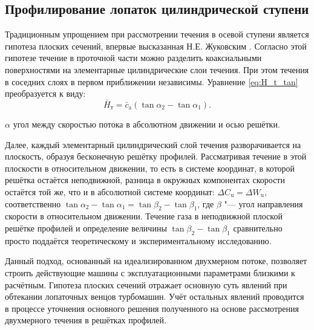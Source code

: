 \subsection{Профилирование лопаток цилиндрической ступени}\label{sec:ch1/profil}

 Традиционным упрощением при рассмотрении течения в осевой ступени является гипотеза плоских сечений, впервые высказанная Н.Е. Жуковским \cite{Joukovskiy1949}. Согласно этой гипотезе течение в проточной части можно разделить коаксиальными поверхностями на элементарные цилиндрические слои течения. При этом течения в соседних слоях в первом приближении независимы. Уравнение \ref{eq:H_t_tan} преобразуется к виду:
\begin{equation}
	\bar{H}_\text{т} = \bar{c}_\text{a} \left( \tan\alpha_2 - \tan\alpha_1 \right).
	\label{eq:H_t_cil}
\end{equation}
\begin{eqexpl}
	\item{$\alpha$} угол между скоростью потока в абсолютном движении и осью решётки.
\end{eqexpl}

Далее, каждый элементарный цилиндрический слой течения разворачивается на плоскость, образуя бесконечную решётку профилей. Рассматривая течение в этой плоскости в относительном движении, то есть в системе координат, в которой решётка остаётся неподвижной, разница в окружных компонентах скорости остаётся той же, что и в абсолютной системе координат: \(\Delta C_\text{u} = \Delta W_\text{u}\), соответственно \(\tan\alpha_2 - \tan\alpha_1 = \tan\beta_2 - \tan\beta_1\), где \(\beta\) "--- угол направления скорости в относительном движении. Течение газа в неподвижной плоской решётке профилей и определение величины \(\tan\beta_2 - \tan\beta_1\) сравнительно просто поддаётся теоретическому и экспериментальному исследованию. 

Данный подход, основанный на идеализированном двухмерном потоке, позволяет строить действующие машины с эксплуатационными параметрами близкими к расчётным. Гипотеза плоских сечений отражает основную суть явлений при обтекании лопаточных венцов турбомашин. Учёт остальных явлений проводится в процессе уточнения основного решения полученного на основе рассмотрения двухмерного течения в решётках профилей.

